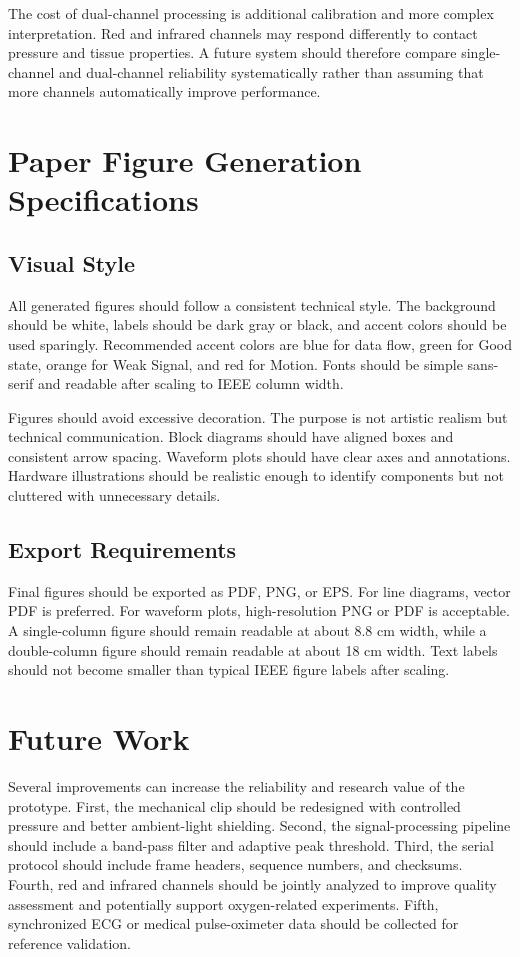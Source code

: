 \documentclass[10pt,conference]{IEEEtran}
\begin{document}
The cost of dual-channel processing is additional calibration and more complex interpretation. Red and infrared channels may respond differently to contact pressure and tissue properties. A future system should therefore compare single-channel and dual-channel reliability systematically rather than assuming that more channels automatically improve performance.

\section{Paper Figure Generation Specifications}
\subsection{Visual Style}
All generated figures should follow a consistent technical style. The background should be white, labels should be dark gray or black, and accent colors should be used sparingly. Recommended accent colors are blue for data flow, green for Good state, orange for Weak Signal, and red for Motion. Fonts should be simple sans-serif and readable after scaling to IEEE column width.

Figures should avoid excessive decoration. The purpose is not artistic realism but technical communication. Block diagrams should have aligned boxes and consistent arrow spacing. Waveform plots should have clear axes and annotations. Hardware illustrations should be realistic enough to identify components but not cluttered with unnecessary details.

\subsection{Export Requirements}
Final figures should be exported as PDF, PNG, or EPS. For line diagrams, vector PDF is preferred. For waveform plots, high-resolution PNG or PDF is acceptable. A single-column figure should remain readable at about 8.8 cm width, while a double-column figure should remain readable at about 18 cm width. Text labels should not become smaller than typical IEEE figure labels after scaling.

\section{Future Work}
Several improvements can increase the reliability and research value of the prototype. First, the mechanical clip should be redesigned with controlled pressure and better ambient-light shielding. Second, the signal-processing pipeline should include a band-pass filter and adaptive peak threshold. Third, the serial protocol should include frame headers, sequence numbers, and checksums. Fourth, red and infrared channels should be jointly analyzed to improve quality assessment and potentially support oxygen-related experiments. Fifth, synchronized ECG or medical pulse-oximeter data should be collected for reference validation.
\end{document}
